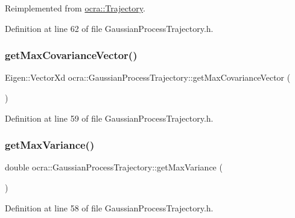 Reimplemented from \hyperlink{classocra_1_1Trajectory_ad65e4ce63f33d79d7880742035a64d6c}{ocra\+::\+Trajectory}.



Definition at line 62 of file Gaussian\+Process\+Trajectory.\+h.

\hypertarget{classocra_1_1GaussianProcessTrajectory_a87864b7a3a7fd6b0384b28ad7d58a3c2}{}\label{classocra_1_1GaussianProcessTrajectory_a87864b7a3a7fd6b0384b28ad7d58a3c2} 
\subsubsection{\texorpdfstring{get\+Max\+Covariance\+Vector()}{getMaxCovarianceVector()}}
{\footnotesize\ttfamily Eigen\+::\+Vector\+Xd ocra\+::\+Gaussian\+Process\+Trajectory\+::get\+Max\+Covariance\+Vector (\begin{DoxyParamCaption}{ }\end{DoxyParamCaption})\hspace{0.3cm}{\ttfamily [inline]}}



Definition at line 59 of file Gaussian\+Process\+Trajectory.\+h.

\hypertarget{classocra_1_1GaussianProcessTrajectory_af5d0a9c6d68d74e60ffa0a6290f4cd6a}{}\label{classocra_1_1GaussianProcessTrajectory_af5d0a9c6d68d74e60ffa0a6290f4cd6a} 
\subsubsection{\texorpdfstring{get\+Max\+Variance()}{getMaxVariance()}}
{\footnotesize\ttfamily double ocra\+::\+Gaussian\+Process\+Trajectory\+::get\+Max\+Variance (\begin{DoxyParamCaption}{ }\end{DoxyParamCaption})\hspace{0.3cm}{\ttfamily [inline]}}



Definition at line 58 of file Gaussian\+Process\+Trajectory.\+h.


